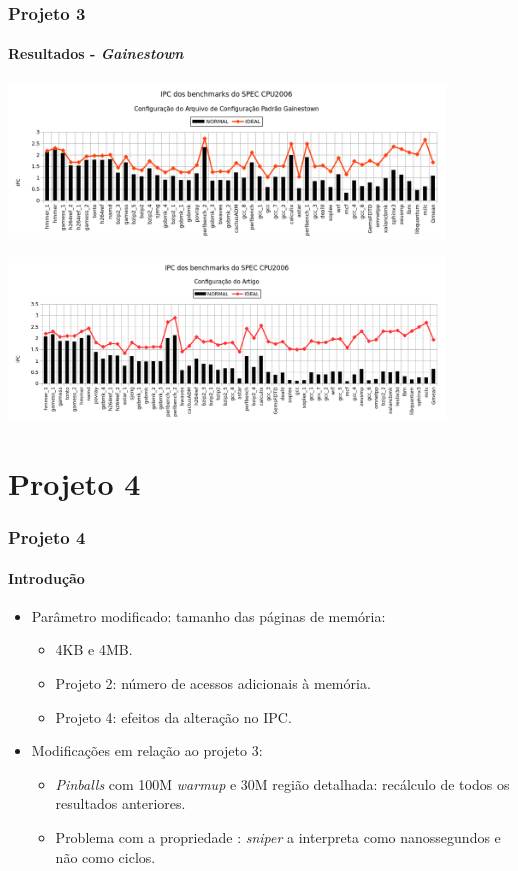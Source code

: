 \documentclass[10pt]{beamer}
\begin{document}
\begin{frame}
\frametitle{Projeto 3}
\framesubtitle{Resultados - \textit{Gainestown}}

\centering
\includegraphics[width=0.87\textwidth]{images/gainestown}

\includegraphics[width=0.87\textwidth]{images/article}

\end{frame}

\section{Projeto 4}

\begin{frame}
\frametitle{Projeto 4}
\framesubtitle{Introdução}

\begin{itemize}

\item Parâmetro modificado: tamanho das páginas de memória:

\begin{itemize} 
	\item 4KB e 4MB.
	\item Projeto 2: número de acessos adicionais à memória. 
	\item Projeto 4: efeitos da alteração no IPC.
		
\end{itemize} 

\vspace{12pt}

\item Modificações em relação ao projeto 3:
 
\begin{itemize} 
	\item \textit{Pinballs} com 100M \textit{warmup} e 30M região detalhada:
	recálculo de todos os resultados anteriores.
  
  	\item Problema com a propriedade :
  	\textit{sniper} a interpreta como nanossegundos e não como ciclos.
	
\end{itemize} 
\end{itemize}

\end{frame}
\end{document}
